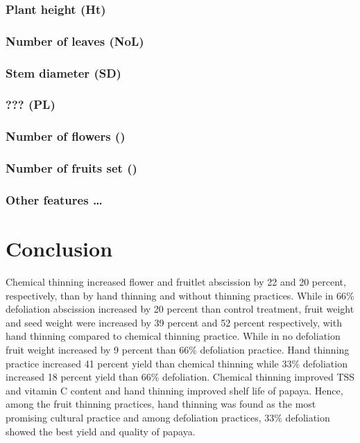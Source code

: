 \documentclass[]{article}
\begin{document}
\subsubsection{Plant height (Ht)}\label{plant-height-ht}

\subsubsection{Number of leaves (NoL)}\label{number-of-leaves-nol}

\subsubsection{Stem diameter (SD)}\label{stem-diameter-sd}

\subsubsection{??? (PL)}\label{pl}

\subsubsection{Number of flowers ()}\label{number-of-flowers}

\subsubsection{Number of fruits set ()}\label{number-of-fruits-set}

\subsubsection{Other features \ldots{}}\label{other-features}

\section{Conclusion}\label{conclusion}

Chemical thinning increased flower and fruitlet abscission by 22 and 20
percent, respectively, than by hand thinning and without thinning
practices. While in 66\% defoliation abscission increased by 20 percent
than control treatment, fruit weight and seed weight were increased by
39 percent and 52 percent respectively, with hand thinning compared to
chemical thinning practice. While in no defoliation fruit weight
increased by 9 percent than 66\% defoliation practice. Hand thinning
practice increased 41 percent yield than chemical thinning while 33\%
defoliation increased 18 percent yield than 66\% defoliation. Chemical
thinning improved TSS and vitamin C content and hand thinning improved
shelf life of papaya. Hence, among the fruit thinning practices, hand
thinning was found as the most promising cultural practice and among
defoliation practices, 33\% defoliation showed the best yield and
quality of papaya.
\end{document}
